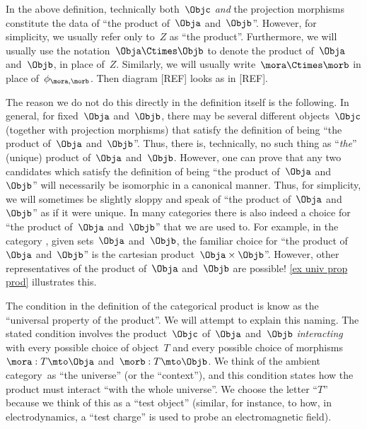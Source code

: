 \begin{remark}
  \label{prod unique up to iso}
  In the above definition, technically both~$\Objc$ \emph{and} the projection morphisms constitute the data of ``the product of~$\Obja$ and~$\Objb$''. However, for simplicity, we usually refer only to~$Z$ as ``the product''. Furthermore, we will usually use the notation~$\Obja \Ctimes \Objb$ to denote the product of~$\Obja$ and~$\Objb$, in place of~$Z$. Similarly, we will usually write~$\mora \Ctimes \morb$ in place of~$\phi_{\mora, \morb}$. Then diagram [REF] looks as in [REF].  
  \begin{figure}[h!]
  \end{figure}
  \label{fig:prod-def-diagram-generic}
  
  
The reason we do not do this directly in the definition itself is the following. In general, for fixed~$\Obja$ and~$\Objb$, there may be several different objects~$\Objc$ (together with projection morphisms) that satisfy the definition of being ``the product of~$\Obja$ and~$\Objb$''. Thus, there is, technically, no such thing as ``\emph{the}'' (unique) product of~$\Obja$ and~$\Objb$. However, one can prove that any two candidates which satisfy the definition of being ``the product of~$\Obja$ and~$\Objb$'' will necessarily be isomorphic in a canonical manner. Thus, for simplicity, we will sometimes be slightly sloppy and speak of ``the product of~$\Obja$ and~$\Objb$'' as if it were unique. In many categories there is also indeed a choice for ``the product of~$\Obja$ and~$\Objb$'' that we are used to. For example, in the category \Set, given sets~$\Obja$ and~$\Objb$, the familiar choice for ``the product of~$\Obja$ and~$\Objb$'' is the cartesian product~$\Obja \times \Objb$''. However, other representatives of the product of~$\Obja$ and~$\Objb$ are possible! \cref{ex univ prop prod} illustrates this.
\end{remark}

\begin{remark}
  The condition in the definition of the categorical product is know as the ``universal property of the product''. We will attempt to explain this naming. The stated condition involves the product~$\Objc$ of~$\Obja$ and~$\Objb$ \emph{interacting} with every possible choice of object~$T$ and every possible choice of morphisms~$\mora : T \mto \Obja$ and~$\morb: T \mto \Objb$. We think of the ambient category~\CatC as ``the universe'' (or the ``context''), and this condition states how the product must interact ``with the whole universe''.
  We choose the letter ``$T$'' because we think of this as a ``test object'' (similar, for instance,  to how, in electrodynamics, a ``test charge'' is used to probe an electromagnetic field).
\end{remark}


